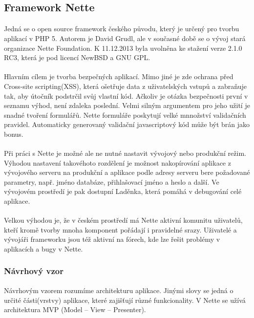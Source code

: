 \documentclass[11pt,a4paper,titlepage,oneside]{book}
\begin{document}
		\subsection{Framework Nette}
			\paragraph{} Jedná se o open source framework českého původu, který je určený pro tvorbu aplikací v PHP 5.  Autorem je David Grudl, ale v současné době se o vývoj stará organizace Nette Foundation. K 11.12.2013 byla uvolněna ke stažení verze 2.1.0 RC3, která je pod licencí NewBSD a GNU GPL.  
			\paragraph{} Hlavním cílem je tvorba bezpečných aplikací. Mimo jiné je zde ochrana před Cross-site scripting(XSS), která ošetřuje data z uživatelských vstupů a zabraňuje tak, aby útočník podstrčil svůj vlastní kód. Ačkoliv je otázka bezpečnosti první v seznamu výhod, není zdaleka poslední. Velmi silným argumentem pro jeho užití je snadné tvoření formulářů. Nette formuláře poskytují velké mnnožství validačních pravidel. Automaticky generovaný validační javascriptový kód může být brán jako bonus.
			\paragraph{} Při práci s Nette je možné ale ne nutné nastavit vývojový nebo produkční režim. Výhodou nastavení takovéhoto rozdělení je možnost nakopírování aplikace z vývojového serveru na produkční a aplikace podle adresy serveru bere požadované parametry, např. jméno databáze, přihlašovací jméno a  heslo a další. Ve vývojovém prostředí je pak dostupní Laděnka, která pomáhá v debugování celé aplikace.
			\paragraph{} Velkou výhodou je, že v českém prostředí má Nette aktivní komunitu uživatelů, kteří kromě tvorby mnoha komponent pořádají i pravidelné srazy.  Uživatelé a vývojáři frameworku jsou též aktivní na fórech, kde lze řešit problémy v aplikacích a bugy v Nette.
			\subsubsection*{Návrhový vzor}
				\paragraph{} Návrhovým vzorem rozumíme architekturu aplikace. Jinými slovy se jedná o určité části(vrstvy) aplikace, které zajišťují různé funkcionality. V Nette se užívá architektura MVP (Model -- View -- Presenter).
\end{document}
